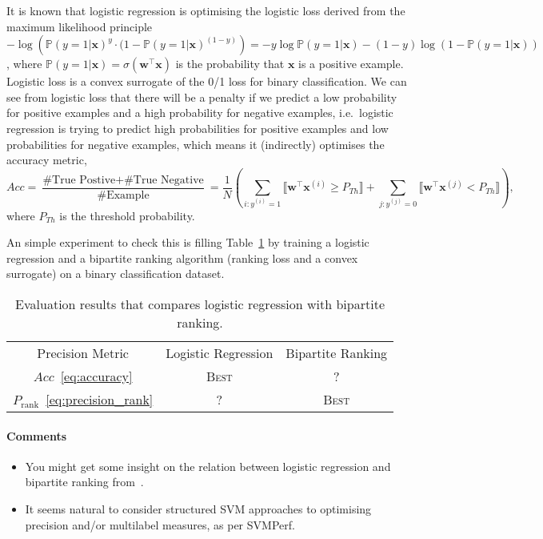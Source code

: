\documentclass[9pt]{extarticle}
\newcommand{\llb}{\llbracket}
\newcommand{\rrb}{\rrbracket}
\newcommand{\x}{\mathbf{x}}
\newcommand{\1}{\mathbf{1}}
\newcommand{\w}{\mathbf{w}}
\newcommand{\p}{\mathbb{P}}
\newcommand{\pb}[1]{^{({#1})}}
\newcommand{\ie}{i.e.\ }
\begin{document}
It is known that logistic regression is optimising the logistic loss derived from the maximum likelihood principle
$-\log \left( \p(y=1 |\x)^y \cdot (1 - \p(y=1 | \x)^{(1-y)} \right) = -y\log\p(y=1 | \x) - (1-y) \log(1-\p(y=1 | \x))$,
where $\p(y=1 | \x) = \sigma(\w^\top \x)$ is the probability that $\x$ is a positive example.
Logistic loss is a convex surrogate of the 0/1 loss for binary classification.
We can see from logistic loss that there will be a penalty if we predict a low probability for positive examples and 
a high probability for negative examples,
\ie logistic regression is trying to predict high probabilities for positive examples and low probabilities for negative examples,
which means it (indirectly) optimises the accuracy metric,
\begin{equation}
\label{eq:accuracy}
Acc = \frac{\text{\#True Postive} + \text{\#True Negative}}{\text{\#Example}} 
    = \frac{1}{N} \left( \sum_{i:y\pb{i}=1} \llb \w^\top \x\pb{i} \ge P_{Th} \rrb + \sum_{j:y\pb{j}=0} \llb \w^\top \x\pb{j} < P_{Th} \rrb \right),
\end{equation}
where $P_{Th}$ is the threshold probability.

An simple experiment to check this is filling Table~\ref{tab:precision} by training a logistic regression and a bipartite ranking algorithm (ranking loss and a convex surrogate) on a binary classification dataset.
\begin{table}[!h]
\centering
\begin{tabular}{c|cc} \hline \hline
Precision Metric                        & Logistic Regression & Bipartite Ranking \\
$Acc$~\ref{eq:accuracy}                 & \textsc{Best}       & ?                 \\
$P_\text{rank}$~\ref{eq:precision_rank} & ?                   & \textsc{Best}     \\ \hline
\end{tabular}
\caption{Evaluation results that compares logistic regression with bipartite ranking.}
\label{tab:precision}
\end{table}

\paragraph{Comments}
{\it
\begin{itemize}
\item You might get some insight on the relation between logistic regression and bipartite ranking from~\cite{kotlowski2011bipartite}.
\item It seems natural to consider structured SVM approaches to optimising precision and/or multilabel measures, as per SVMPerf.
\end{itemize}
}
\end{document}
